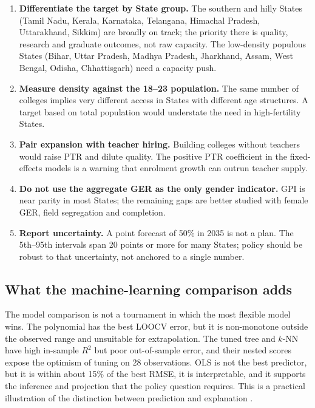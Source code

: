 \begin{enumerate}
  \item \textbf{Differentiate the target by State group.} The southern and hilly States (Tamil Nadu, Kerala, Karnataka, Telangana, Himachal Pradesh, Uttarakhand, Sikkim) are broadly on track; the priority there is quality, research and graduate outcomes, not raw capacity. The low-density populous States (Bihar, Uttar Pradesh, Madhya Pradesh, Jharkhand, Assam, West Bengal, Odisha, Chhattisgarh) need a capacity push.
  \item \textbf{Measure density against the 18--23 population.} The same number of colleges implies very different access in States with different age structures. A target based on total population would understate the need in high-fertility States.
  \item \textbf{Pair expansion with teacher hiring.} Building colleges without teachers would raise PTR and dilute quality. The positive PTR coefficient in the fixed-effects models is a warning that enrolment growth can outrun teacher supply.
  \item \textbf{Do not use the aggregate GER as the only gender indicator.} GPI is near parity in most States; the remaining gaps are better studied with female GER, field segregation and completion.
  \item \textbf{Report uncertainty.} A point forecast of 50\% in 2035 is not a plan. The 5th--95th intervals span 20 points or more for many States; policy should be robust to that uncertainty, not anchored to a single number.
\end{enumerate}

\subsection{What the machine-learning comparison adds}

The model comparison is not a tournament in which the most flexible model wins. The polynomial has the best LOOCV error, but it is non-monotone outside the observed range and unsuitable for extrapolation. The tuned tree and \(k\)-NN have high in-sample \(R^2\) but poor out-of-sample error, and their nested scores expose the optimism of tuning on 28 observations. OLS is not the best predictor, but it is within about 15\% of the best RMSE, it is interpretable, and it supports the inference and projection that the policy question requires. This is a practical illustration of the distinction between prediction and explanation \cite{mullainathan2017,athey2019}.
